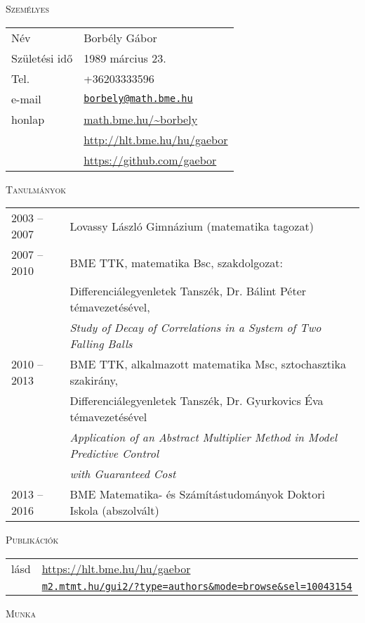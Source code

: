 \documentclass[12pt]{article}
\newcommand\mail[1]{\href{mailto:#1}{\texttt{#1}}}
\begin{document}
 \thispagestyle{empty}

\textsc{Személyes}

       \begin{tabular}{p{3cm}l}
	       Név & Borbély Gábor \\
           Születési idő & 1989 március 23.\\
		   Tel. &  +36203333596\\
		   e-mail & \mail{borbely@math.bme.hu}\\
		   honlap & \url{math.bme.hu/~borbely} \\
                  & \url{http://hlt.bme.hu/hu/gaebor} \\
                  & \url{https://github.com/gaebor}
       \end{tabular}
 
 \textsc{Tanulmányok}
 
 \begin{tabular}{p{3cm}l}
	       2003 -- 2007 & Lovassy László Gimnázium (matematika tagozat) \\
           2007 -- 2010& BME TTK, matematika Bsc, szakdolgozat: \\
		              & Differenciálegyenletek Tanszék, Dr. Bálint Péter témavezetésével, \\
					  & \emph{Study of Decay of Correlations in a System of Two Falling Balls} \\
		   2010 -- 2013 & BME TTK, alkalmazott matematika Msc, sztochasztika szakirány,\\
						& Differenciálegyenletek Tanszék, Dr. Gyurkovics Éva témavezetésével \\
						& \emph{Application of an Abstract Multiplier Method in Model Predictive Control}\\ & \emph{ with Guaranteed Cost} \\
		   2013 -- 2016 & BME Matematika- és Számítástudományok Doktori Iskola (abszolvált)
       \end{tabular}

 \textsc{Publikációk}

        \begin{tabular}{p{3cm}l}
	       lásd & \url{https://hlt.bme.hu/hu/gaebor} \\ 
               &  \href{https://m2.mtmt.hu/gui2/?type=authors&mode=browse&sel=10043154}{\texttt{m2.mtmt.hu/gui2{\footnotesize/?type=authors\&mode=browse\&sel=10043154}}}
       \end{tabular}  

 \textsc{Munka}
\end{document}
